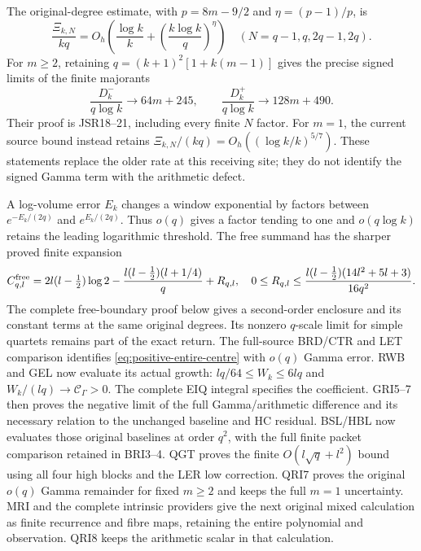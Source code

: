 \documentclass[11pt,a4paper]{article}
\begin{document}
The original-degree estimate, with $p=8m-9/2$ and
$\eta=(p-1)/p$, is
\begin{equation}
 \frac{\Xi_{k,N}}{kq}
 =O_h\!\left(\frac{\log k}{k}
                  +\left(\frac{k\log k}{q}\right)^\eta\right)
 \quad(N=q-1,q,2q-1,2q).
\end{equation}
For $m\ge2$, retaining $q=(k+1)^2[1+k(m-1)]$ gives the precise
signed limits of the finite majorants
\begin{equation}
 \frac{D_k^-}{q\log k}\longrightarrow64m+245,
 \qquad \frac{D_k^+}{q\log k}\longrightarrow128m+490.
\end{equation}
Their proof is JSR18--21, including every finite $N$ factor.
For $m=1$, the current source bound instead retains
$\Xi_{k,N}/(kq)=O_h((\log k/k)^{5/7})$.
These statements replace the older rate at this receiving site;
they do not identify the signed Gamma term with the arithmetic defect.

A log-volume error $E_k$ changes a window exponential by factors
between $e^{-E_k/(2q)}$ and $e^{E_k/(2q)}$. Thus $o(q)$ gives a
factor tending to one and $o(q\log k)$ retains the leading logarithmic
threshold. The free summand has the sharper proved finite expansion
\begin{equation}
 C_{q,l}^{\rm free}=2l(l-\tfrac12)\log2
 -\frac{l(l-\tfrac12)(l+1/4)}q+R_{q,l},\quad
 0\le R_{q,l}\le\frac{l(l-\tfrac12)(14l^2+5l+3)}{16q^2}.
\end{equation}
The complete free-boundary proof below gives a second-order enclosure
and its constant terms at the same original degrees. Its nonzero
$q$-scale limit for simple quartets remains part of the exact return.
The full-source BRD/CTR and LET comparison identifies
\eqref{eq:positive-entire-centre} with $o(q)$ Gamma error.
RWB and GEL now evaluate its actual growth:
$lq/64\leq W_k\leq6lq$ and $W_k/(lq)\to\mathcal C_\Gamma>0$.
The complete EIQ integral specifies the coefficient. GRI5--7
then proves the negative limit of the full Gamma/arithmetic
difference and its necessary relation to the unchanged baseline
and HC residual. BSL/HBL now evaluates those original baselines at order $q^2$,
with the full finite packet comparison retained in BRI3--4.
QGT proves the finite $O(l\sqrt q+l^2)$ bound using all four
high blocks and the LER low correction. QRI7 proves the original
$o(q)$ Gamma remainder for fixed $m\ge2$ and keeps the full
$m=1$ uncertainty. MRI and the complete intrinsic providers give
the next original mixed calculation as finite recurrence and fibre
maps, retaining the entire polynomial and observation. QRI8 keeps
the arithmetic scalar in that calculation.
\end{document}
